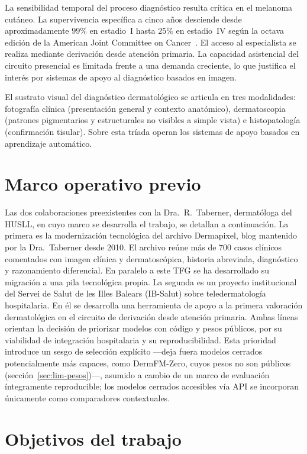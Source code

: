 La sensibilidad temporal del proceso diagnóstico resulta crítica en
el melanoma cutáneo. La supervivencia específica a cinco años
desciende desde aproximadamente $99\%$ en estadio~I hasta
$25\%$ en estadio~IV según la octava edición de la American
Joint Committee on Cancer~\cite{ajcc8}. El acceso al especialista
se realiza mediante derivación desde atención primaria. La
capacidad asistencial del circuito presencial es limitada frente a
una demanda creciente, lo que justifica el interés por sistemas de
apoyo al diagnóstico basados en imagen.

El sustrato visual del diagnóstico dermatológico se articula en tres
modalidades: fotografía clínica (presentación general y contexto
anatómico), dermatoscopia (patrones pigmentarios y estructurales no
visibles a simple vista) e histopatología (confirmación
tisular). Sobre esta tríada operan los sistemas de apoyo basados en
aprendizaje automático.


\section{Marco operativo previo}
\label{sec:trabajo-previo}

Las dos colaboraciones preexistentes con la Dra.~R.~Taberner,
dermatóloga del HUSLL, en cuyo marco se desarrolla el trabajo, se
detallan a continuación. La primera es la modernización tecnológica
del archivo Dermapixel,
blog mantenido por la Dra.~Taberner desde 2010. El archivo reúne
más de $700$ casos clínicos comentados con imagen clínica y
dermatoscópica, historia abreviada, diagnóstico y razonamiento
diferencial. En paralelo a este TFG se ha desarrollado su migración
a una pila tecnológica propia. La segunda es un proyecto
institucional del Servei de Salut de les Illes Balears (IB-Salut)
sobre teledermatología hospitalaria. En él se desarrolla una
herramienta de apoyo a la primera valoración dermatológica en el
circuito de derivación desde atención primaria. Ambas líneas
orientan la decisión de priorizar modelos con código y pesos
públicos, por su viabilidad de integración hospitalaria y su
reproducibilidad. Esta prioridad introduce un sesgo de selección
explícito ---deja fuera modelos cerrados potencialmente más capaces,
como DermFM-Zero, cuyos pesos no son públicos
(sección~\ref{sec:lim-pesos})---, asumido a cambio de un marco de
evaluación íntegramente reproducible; los modelos cerrados accesibles
vía API se incorporan únicamente como comparadores contextuales.


\section{Objetivos del trabajo}
\label{sec:objetivos}

